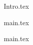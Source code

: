 \documentclass[addpoints]{exam}
\begin{document}
{Intro.tex}

\newpage

\tableofcontents 

\newpage 

{main.tex}

\newpage 

{main.tex}
\end{document}
